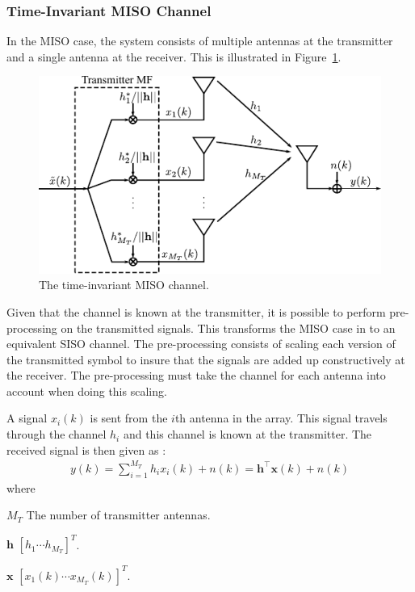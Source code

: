 \subsubsection{Time-Invariant MISO Channel}
In the MISO case, the system consists of multiple antennas at the transmitter and a single antenna at the receiver. This is illustrated in Figure~\ref{fig:misoModel}.
\begin{figure}[htbp]
  \centering
  \includegraphics[scale=1.2]{img/analysis/misoModel}
  \caption{The time-invariant MISO channel.}
  \label{fig:misoModel}
\end{figure}
Given that the channel is known at the transmitter, it is possible to perform pre-processing on the transmitted signals. This transforms the MISO case in to an equivalent SISO channel. The pre-processing consists of scaling each version of the transmitted symbol to insure that the signals are added up constructively at the receiver. The pre-processing must take the channel for each antenna into account when doing this scaling. 

A signal $x_i(k)$ is sent from the $i$th antenna in the array. This signal travels through the channel $h_i$ and this channel is known at the transmitter. The received signal is then given as \cite{Tim2012Practical}: 
\begin{align}%
  y(k) = \sum_{i=1}^{M_T} h_ix_i(k) + n(k) = \mathbf{h}^\intercal \mathbf{x}(k) + n(k)
\end{align}
where
\begin{where}
  \item[$M_T$] The number of transmitter antennas.
  \item[$\mathbf{h}$] $[h_1 \cdots h_{M_T}]^T$.
  \item[$\mathbf{x}$] $[x_1(k) \cdots x_{M_T}(k)]^T$.
\end{where}


